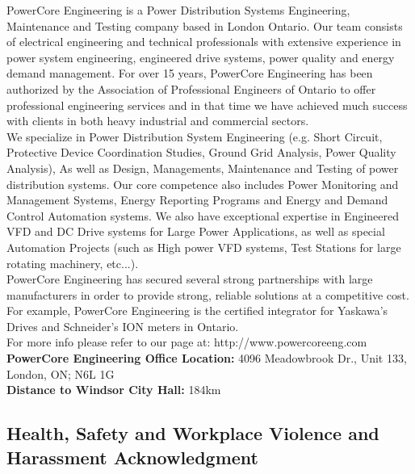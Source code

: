 \noindent PowerCore Engineering is a Power Distribution Systems Engineering, Maintenance and Testing company based in London Ontario.  Our team consists of electrical engineering and technical professionals with extensive experience in power system engineering, engineered drive systems, power quality and energy demand management.  For over 15 years, PowerCore Engineering has been authorized by the Association of Professional Engineers of Ontario to offer professional engineering services and in that time we have achieved much success with clients in both heavy industrial and commercial sectors. \\ 

\noindent We specialize in Power Distribution System Engineering (e.g. Short Circuit, Protective Device Coordination Studies, Ground Grid Analysis, Power Quality Analysis), As well as Design, Managements, Maintenance and Testing of power distribution systems.  Our core competence also includes Power Monitoring and Management Systems, Energy Reporting Programs and Energy and Demand Control Automation systems.  We also have exceptional expertise in Engineered VFD and DC Drive systems for Large Power Applications, as well as special Automation Projects (such as High power VFD systems, Test Stations for large rotating machinery, etc...).\\


\noindent PowerCore Engineering has secured several strong partnerships with large manufacturers in order to provide strong, reliable solutions at a competitive cost.  For example, PowerCore Engineering is the certified integrator for Yaskawa's Drives and Schneider's ION meters in Ontario.\\


\noindent For more info please refer to our page at:  http://www.powercoreeng.com\\

\noindent\textbf{PowerCore Engineering Office Location:} \textcolor[rgb]{0,0,0}{\textcolor[rgb]{0,0,1}{4096 Meadowbrook Dr., Unit 133, London, ON;  N6L 1G}}\\
\noindent\textbf{Distance to Windsor City Hall:} \textcolor[rgb]{0,0,1}{184km}\\

 
\pagebreak

\subsection{Health, Safety and Workplace Violence and Harassment Acknowledgment}
\label{Sub:HS}

